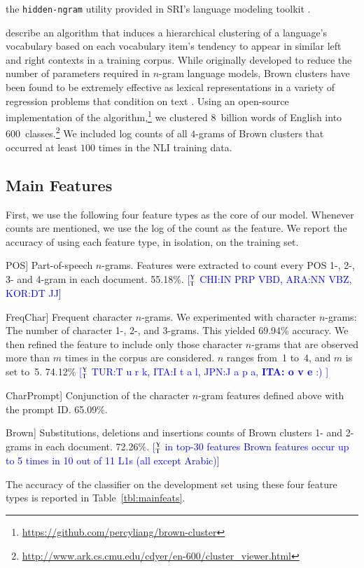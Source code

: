 \documentclass[11pt,letterpaper]{article}
\newcommand{\ensuretext}[1]{#1}
\newcommand{\ytmarker}{\ensuretext{\textcolor{blue}{\ensuremath{^{\textsc{Y}}_{\textsc{T}}}}}}
\newcommand{\arkcomment}[3]{\ensuretext{\textcolor{#3}{[#1 #2]}}}
\newcommand{\yt}[1]{\arkcomment{\ytmarker}{#1}{blue}}
\newcommand{\Tref}[1]{Table~\ref{#1}}
\newcommand{\feat}[1]{\textsmaller[.5]{\textsf{#1}}} %
\begin{document}
\begin{compactdesc}
  the \texttt{hidden-ngram} utility provided in SRI's language modeling toolkit
  \citep{stolcke02srilm}.
\item[Brown clusters] \cite{brown:cl1992} describe an algorithm that induces a hierarchical clustering of a language's vocabulary based on each vocabulary item's tendency to appear in similar left and right contexts in a training corpus. While originally developed to reduce the number of parameters required in $n$-gram language models, Brown clusters have been found to be extremely effective as lexical representations in a variety of regression problems that condition on text \citep{koo:2008,turian:acl2010,owoputi:2013}.  Using an open-source implementation of the algorithm,\footnote{\url{https://github.com/percyliang/brown-cluster}} we clustered 8~billion words of English into 600~classes.\footnote{\url{http://www.ark.cs.cmu.edu/cdyer/en-600/cluster_viewer.html}}  We included log counts of all $4$-grams of Brown clusters that occurred at least $100$ times in the NLI training data.

\end{compactdesc}

\subsection{Main Features}
\label{sec:mainfeats}
First, we use the following four feature types as the core of our
model.  Whenever counts are mentioned, we use the log of the count as
the feature.  We report the accuracy of using each feature type, in
isolation, on the training set.

\begin{compactdesc}
\item[\feat{POS}] Part-of-speech $n$-grams.  Features were extracted
  to count every POS 1-, 2-, 3- and 4-gram in each
  document. 55.18\%. \yt{CHI:IN PRP VBD, ARA:NN VBZ, KOR:DT JJ} 
\item[\feat{FreqChar}] Frequent character $n$-grams.  We experimented
  with character $n$-grams: The number of character 1-, 2-, and
  3-grams. This yielded 69.94\% accuracy.  We then refined the feature
  to include only those character $n$-grams that are observed more
  than $m$ times in the corpus are considered. $n$ ranges from~1
    to~4, and $m$ is set to~5. 74.12\% \yt{TUR:T u r k, ITA:I t a l, JPN:J a p a, \textbf{ITA: o v e} :) }  
\item[\feat{CharPrompt}] Conjunction of the character $n$-gram
  features defined above with the prompt ID. 65.09\%.
\item[\feat{Brown}] Substitutions, deletions and insertions counts of Brown clusters 1- and 2-grams in each document. 72.26\%. \yt{in top-30 features Brown features occur up to 5 times in 10 out of 11 L1s (all except Arabic)} 
\end{compactdesc}
\noindent
The accuracy of the classifier on the development set using these four
feature types is reported in \Tref{tbl:mainfeats}.
\end{document}
